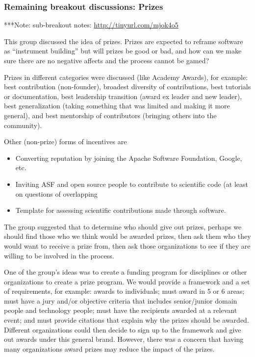 \documentclass[11pt, oneside]{amsart}
\newcommand{\note}[1]{ {\textcolor{blueish}    { ***Note:      #1 }}}
\begin{document}
\subsubsection{Remaining breakout discussions: Prizes}\label{sec:prizes}
\note{sub-breakout notes: \url{http://tinyurl.com/mjok4o5}}

This group discussed the idea of prizes. Prizes are expected to reframe software
as ``instrument building'' but will prizes be good or bad, and how can we make
sure there are no negative affects and the process cannot be gamed?
  
Prizes in different categories were discussed (like Academy Awards), for
example: best contribution (non-founder), broadest diversity of contributions,
best tutorials or documentation, best leadership transition (award ex leader and
new leader), best generalization (taking something that was limited and making
it more general), and best mentorship of contributors (bringing others into the
community).
 
Other (non-prize) forms of incentives are
\begin{itemize}
\item Converting reputation by joining the Apache Software Foundation, Google, etc. 
\item Inviting ASF and open source people to contribute to scientific code (at
least on questions of overlapping
\item Template for assessing scientific contributions made through software.   
\end{itemize}

The group suggested that to determine who should give out prizes, perhaps we
should find those who we think would be awarded prizes, then ask them who they
would want to receive a prize from, then ask those organizations to see if they
are willing to be involved in the process.

One of the group's ideas was to create a funding program for disciplines or
other organizations to create a prize program. We would provide a framework and
a set of requirements, for example: awards to individuals; must award in 5 or 6
areas; must have a jury and/or objective criteria that includes senior/junior
domain people and technology people; must have the recipients awarded at a
relevant event; and must provide citations that explain why the prizes should be
awarded. Different organizations could then decide to sign up to the framework
and give out awards under this general brand. However, there was a concern that
having many organizations award prizes may reduce the impact of the prizes.
\end{document}
